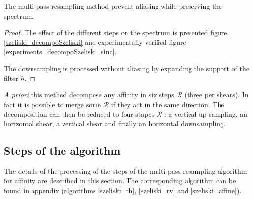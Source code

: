 	\begin{thm}
	The multi-pass resampling method \cite{szeliski2010high} prevent aliasing while preserving the spectrum. %
	\end{thm}
	\begin{proof}
	The effect of the different steps on the spectrum is presented figure \ref{szeliski_decompoSzeliski} and experimentally verified figure \ref{experiments_decompoSzeliski_sinc}.
	
	The downsampling is processed without aliasing by expanding the support of the filter $h$.
	\end{proof}
	
	
	
	\emph{A priori} this method decompose any affinity in six steps $\mathcal R$ (three per shears). In fact it is possible to merge some $\mathcal R$ if they act in the same direction. The decomposition can then be reduced to four stapes $\mathcal R$ : a vertical up-sampling, an horizontal shear, a vertical shear and finally an horizontal downsampling.
	
	
\subsection{Steps of the algorithm}
	\label{szeliski_affine_section}
	
	The details of the processing of the steps of the multi-pass resampling algorithm for affinity are described in this section. The corresponding algorithm can be found in appendix (algorithms \ref{szeliski_rh}, \ref{szeliski_rv} and \ref{szeliski_affine}).
	
